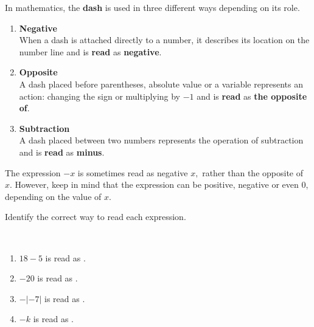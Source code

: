 \documentclass{ximera}[font=12pt]
\begin{document}
\begin{definition} 

In mathematics, the \textbf{dash} is used in three different ways depending on its role. 

\begin{enumerate} 
    \item \textbf{\textcolor{accessibleGlaucous}{Negative}} \\
    When a dash is attached directly to a number, it describes its location on the number line and is \textbf{read} as \textbf{negative}. \\
    
    \item \textbf{\textcolor{accessibleGlaucous}{Opposite}} \\
    A dash placed before parentheses, absolute value or a variable represents an action: changing the sign or multiplying by $-1$ and is \textbf{read} as \textbf{the opposite of}. \\ 
    
    \item \textbf{\textcolor{accessibleGlaucous}{Subtraction}} \\ 
    A dash placed between two numbers represents the operation of subtraction and is \textbf{read} as \textbf{minus}. 
\end{enumerate} 
\end{definition}



\begin{remark}
The expression $-x$ is sometimes read as negative $x,$ rather than the opposite of $x.$  However, keep in mind that the expression
can be positive, negative or even 0, depending on the value of $x.$  
\end{remark}


\begin{problem}
Identify the correct way to read each expression.

~ \\[1em]

\begin{enumerate}
\item $18 - 5$ is read as .
\item $-20$ is read as . \\ 
\item $-|-7|$ is read as . \\ 
\item $-k$ is read as . \\ 
\end{enumerate}

\end{problem}
\end{document}
